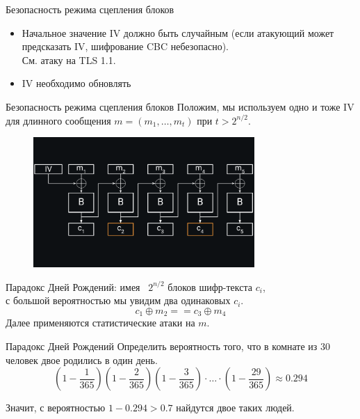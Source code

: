 \documentclass[usenames,dvipsnames,8pt,aspectratio=169]{beamer}
\begin{document}
\begin{frame}{Безопасность режима сцепления блоков}
\Large
\begin{itemize}
\itemsep 10pt
\item Начальное значение IV должно быть {\color{Orange} случайным} (если атакующий может предсказать IV, шифрование CBC небезопасно).\\ 
См. атаку на TLS 1.1.

\item{\color{Orange} IV необходимо обновлять}  \\

\end{itemize}
\end{frame}

\begin{frame}{Безопасность режима сцепления блоков}
\Large
Положим, мы используем одно и тоже IV для длинного сообщения $m=(m_1, \ldots, m_t)$ при $t> 2^{n/2}$.
\vspace{-10pt}
\begin{figure}
\includegraphics[width=0.75\textwidth]{CBC_1}
\end{figure}
\vspace{-40pt}
{\color{Orange}Парадокс Дней Рождений:} имея ~$2^{n/2}$ блоков шифр-текста $c_i$, \\ с большой вероятностью мы увидим два одинаковых $c_i$.
\Large
\[
c_1 \oplus m_2 == c_3 \oplus m_4
\]
Далее применяются статистические атаки на $m$.
\end{frame}

\begin{frame}{Парадокс Дней Рождений}
\Large
{\color{Orange} Определить вероятность того, что в комнате из 30 человек двое родились в один день.}\\
\pause
\vspace{30pt}
\[
\left(1 - \frac{1}{365}\right)  \left(1 - \frac{2}{365}\right) \left(1 - \frac{3}{365}\right) \cdot \ldots \cdot \left(1 - \frac{29}{365}\right)  \approx 0.294
\]

\vspace{30pt}
Значит, с вероятностью $1-0.294>0.7$ найдутся двое таких людей.

\end{frame}
\end{document}
